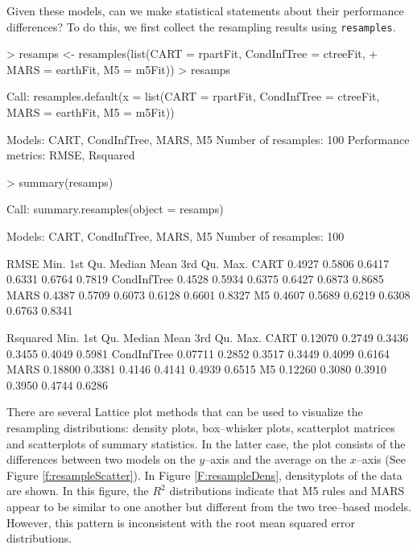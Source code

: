 \documentclass[12pt]{article}
\begin{document}
Given these models, can we make statistical statements about their performance differences? To do this, we first collect the resampling results using \texttt{resamples}.

\begin{Schunk}
\begin{Sinput}
> resamps <- resamples(list(CART = rpartFit, CondInfTree = ctreeFit, 
+     MARS = earthFit, M5 = m5Fit))
> resamps
\end{Sinput}
\begin{Soutput}
Call:
resamples.default(x = list(CART = rpartFit, CondInfTree = ctreeFit,     MARS = earthFit, M5 = m5Fit))

Models: CART, CondInfTree, MARS, M5 
Number of resamples: 100 
Performance metrics: RMSE, Rsquared 
\end{Soutput}
\begin{Sinput}
> summary(resamps)
\end{Sinput}
\begin{Soutput}
Call:
summary.resamples(object = resamps)

Models: CART, CondInfTree, MARS, M5 
Number of resamples: 100 

RMSE 
              Min. 1st Qu. Median   Mean 3rd Qu.   Max.
CART        0.4927  0.5806 0.6417 0.6331  0.6764 0.7819
CondInfTree 0.4528  0.5934 0.6375 0.6427  0.6873 0.8685
MARS        0.4387  0.5709 0.6073 0.6128  0.6601 0.8327
M5          0.4607  0.5689 0.6219 0.6308  0.6763 0.8341

Rsquared 
               Min. 1st Qu. Median   Mean 3rd Qu.   Max.
CART        0.12070  0.2749 0.3436 0.3455  0.4049 0.5981
CondInfTree 0.07711  0.2852 0.3517 0.3449  0.4099 0.6164
MARS        0.18800  0.3381 0.4146 0.4141  0.4939 0.6515
M5          0.12260  0.3080 0.3910 0.3950  0.4744 0.6286
\end{Soutput}
\end{Schunk}

There are several Lattice plot methods that can be used to visualize
the resampling distributions: density plots, box--whisker plots,
scatterplot matrices and scatterplots of summary statistics. In the
latter case, the plot consists of the differences between two models
on the $y$--axis and the average on the $x$--axis (See Figure
\ref{f:resampleScatter}). In Figure \ref{F:resampleDens}, densityplots
of the data are shown. In this figure,  the $R^2$ distributions
indicate that M5 rules and MARS appear to be
        similar to one another but different from the two tree--based
        models. However, this pattern is inconsistent with the root
        mean squared error distributions.
\end{document}
